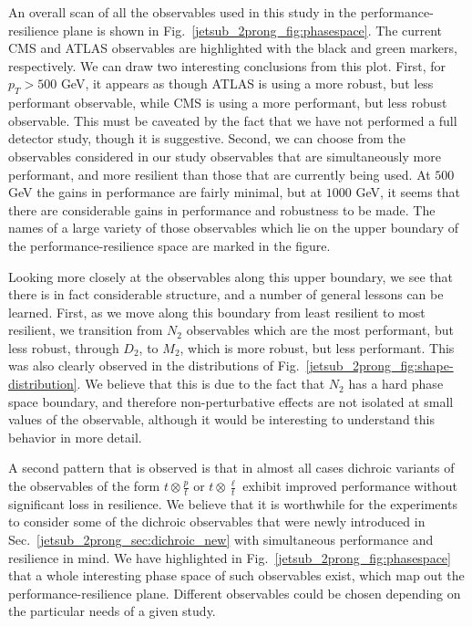 \documentclass[11pt,letterpaper]{article}
\begin{document}
An overall scan of all the observables used in this study in the performance-resilience plane is shown in Fig.~\ref{jetsub_2prong_fig:phasespace}.
%
The current CMS and ATLAS observables are highlighted with the black and green markers, respectively. We can draw two interesting conclusions from this plot.
%
First, for $p_T> 500$ GeV, it appears as though ATLAS is using a more robust, but less performant observable, while CMS is using a more performant, but less robust observable.
%
This must be caveated by the fact that we have not performed a full detector study, though it is suggestive.
%
Second, we can choose from the observables considered in our study observables that are simultaneously more performant, and more resilient than those that are currently being used.
%
At $500$ GeV the gains in performance are fairly minimal, but at $1000$ GeV, it seems that there are considerable gains in performance and robustness to be made.
%
The names of a large variety of those observables which lie on the upper boundary of the performance-resilience space are marked in the figure. 


Looking more closely at the observables along this upper boundary, we see that there is in fact considerable structure, and a number of general lessons can be learned.
%
First, as we move along this boundary from least resilient to most resilient, we transition from $N_2$ observables which are the most performant, but less robust, through $D_2$, to $M_2$, which is more robust, but less performant.
%
This was also clearly observed in the distributions of Fig.~\ref{jetsub_2prong_fig:shape-distribution}.
%
We believe that this is due to the fact that $N_2$ has a hard phase space boundary, and therefore non-perturbative effects are not isolated at small values of the observable, although it would be interesting to understand this behavior in more detail. 

A second pattern that is observed is that in almost all cases dichroic variants of the observables of the form $t\otimes \frac{p}{t}$ or $t\otimes\frac{\ell}{t}$ exhibit improved performance without significant loss in resilience.
%
We believe that it is worthwhile for the experiments to consider some of the dichroic observables that were newly introduced in Sec.~\ref{jetsub_2prong_sec:dichroic_new} with simultaneous performance and resilience in mind.
%
We have highlighted in Fig.~\ref{jetsub_2prong_fig:phasespace} that a whole interesting phase space of such observables exist, which map out the performance-resilience plane.
%
Different observables could be chosen depending on the particular needs of a given study.
\end{document}
